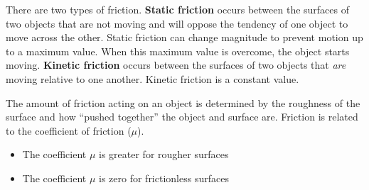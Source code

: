 \documentclass[dvipsnames]{article}
\begin{document}
\begin{center}
\end{center}

There are two types of friction. \textbf{Static friction} occurs between the surfaces of two objects that are not moving and will oppose the tendency of one object to move across the other. Static friction can change magnitude to prevent motion up to a maximum value. When this maximum value is overcome, the object starts moving. \textbf{Kinetic friction} occurs between the surfaces of two objects that \textit{are} moving relative to one another. Kinetic friction is a constant value.

\begin{center}
\end{center}

The amount of friction acting on an object is determined by the roughness of the surface and how ``pushed together'' the object and surface are. Friction is related to the coefficient of friction ($\mu$).

\begin{itemize}[topsep=0pt,itemsep=0pt]
    \item The coefficient $\mu$ is greater for rougher surfaces
    \item The coefficient $\mu$ is zero for frictionless surfaces
\end{itemize}
\end{document}
